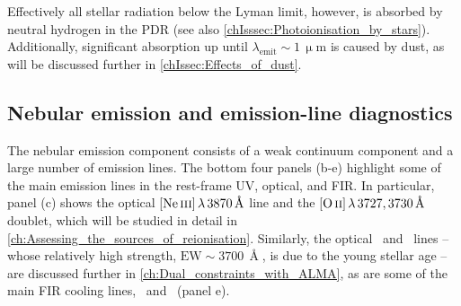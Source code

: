 Effectively all stellar radiation below the Lyman limit, however, is absorbed by neutral hydrogen in the PDR (see also \cref{chIsssec:Photoionisation_by_stars}). Additionally, significant absorption up until $\lambda_\text{emit} \sim 1 \, \mathrm{\upmu m}$ is caused by dust, as will be discussed further in \cref{chIssec:Effects_of_dust}.

\subsection{Nebular emission and emission-line diagnostics}
\label{chIssec:Nebular_emission_and_emission-line_diagnostics}

The nebular emission component consists of a weak continuum component and a large number of emission lines. The bottom four panels (b-e) highlight some of the main emission lines in the rest-frame UV, optical, and FIR. In particular, panel (c) shows the optical $\NeIII \, \lambda \, 3870 \, \Angstrom$ line and the $\OII \, \lambda \, 3727, 3730 \, \Angstrom$ doublet, which will be studied in detail in \cref{ch:Assessing_the_sources_of_reionisation}. Similarly, the optical \OIIIf\ and \Hbeta\ lines -- whose relatively high strength, $\text{EW} \sim 3700 \, \Angstrom$, is due to the young stellar age -- are discussed further in \cref{ch:Dual_constraints_with_ALMA}, as are some of the main FIR cooling lines, \CIILam\ and \OIIILam\ (panel e).

